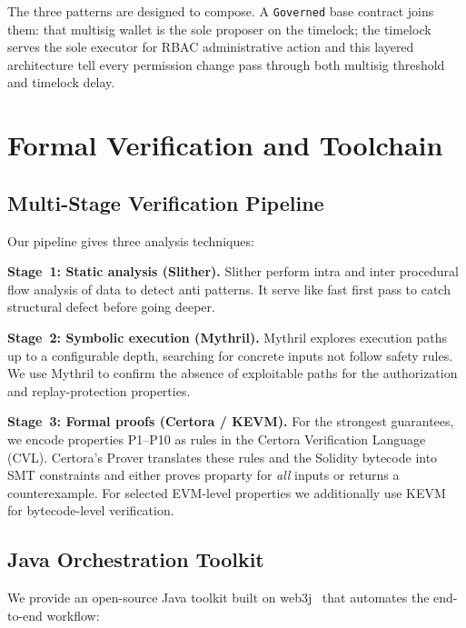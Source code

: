\documentclass[conference]{IEEEtran}
\begin{document}
The three patterns are designed to compose.  A \texttt{Governed}
base contract joins them: that multisig wallet is the
sole proposer on the timelock; the timelock serves the sole
executor for RBAC administrative action and this layered architecture
tell every permission change pass through both
multisig threshold and timelock delay.

\section{Formal Verification and Toolchain}
\label{sec:verification}

\subsection{Multi-Stage Verification Pipeline}

Our pipeline gives three analysis techniques:

\textbf{Stage~1: Static analysis (Slither).}
Slither perform intra and inter procedural
flow analysis of data to detect anti patterns.  It
serve like fast first pass to catch structural defect before
going deeper.

\textbf{Stage~2: Symbolic execution (Mythril).}
Mythril explores execution paths up to a
configurable depth, searching for concrete inputs not follow safety
rules.  We use Mythril to confirm the absence of exploitable paths
for the authorization and replay-protection properties.

\textbf{Stage~3: Formal proofs (Certora / KEVM).}
For the strongest guarantees, we encode properties P1--P10 as rules
in the Certora Verification Language (CVL).  Certora's Prover
translates these rules and the Solidity bytecode into SMT constraints
and either proves proparty for \emph{all} inputs or returns
a counterexample.  For selected EVM-level properties we additionally
use KEVM for bytecode-level verification.

\subsection{Java Orchestration Toolkit}

We provide an open-source Java toolkit built on
web3j~\cite{web3j2024} that automates the end-to-end workflow:
\end{document}
